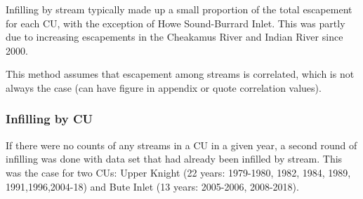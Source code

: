\documentclass[11pt]{book}
\begin{document}
Infilling by stream typically made up a small proportion of the total escapement for each CU, with the exception of Howe Sound-Burrard Inlet. This was partly due to increasing escapements in the Cheakamus River and Indian River since 2000.

This method assumes that escapement among streams is correlated, which is not always the case (can have figure in appendix or quote correlation values).

\hypertarget{infilling-by-cu}{%
\subsubsection{Infilling by CU}\label{infilling-by-cu}}

If there were no counts of any streams in a CU in a given year, a second round of infilling was done with data set that had already been infilled by stream. This was the case for two CUs: Upper Knight (22 years: 1979-1980, 1982, 1984, 1989, 1991,1996,2004-18) and Bute Inlet (13 years: 2005-2006, 2008-2018).
\end{document}
